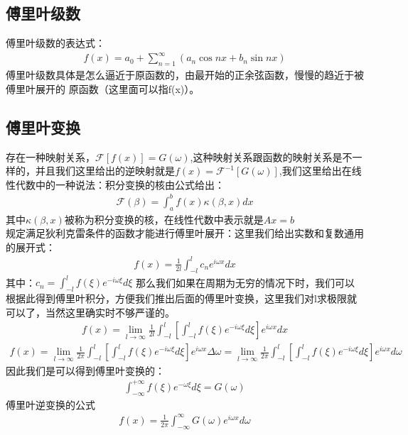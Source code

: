 \documentclass[UTF8]{article}
\begin{document}
\subsection{傅里叶级数}
傅里叶级数的表达式：
\begin{align*}
	f(x)=a_0+\sum_{n=1}^{\infty}(a_n \cos nx +b_n\sin nx)
\end{align*}
傅里叶级数具体是怎么逼近于原函数的，由最开始的正余弦函数，慢慢的趋近于被傅里叶展开的
原函数（这里面可以指f(x)）。
\subsection{傅里叶变换}
存在一种映射关系，$\mathcal{F}[f(x)]=G(\omega)$,这种映射关系跟函数的映射关系是不一样的，并且我们这里给出的逆映射就是$f(x)=\mathcal{F}^{-1}[G(\omega)]$,我们这里给出在线性代数中的一种说法：积分变换的核由公式给出：
\begin{align*}
	\mathcal{F}(\beta)=\int_a^b f(x)\kappa(\beta,x)dx
\end{align*}
其中$\kappa(\beta,x)$被称为积分变换的核，在线性代数中表示就是$Ax=b$\\
规定满足狄利克雷条件的函数才能进行傅里叶展开：这里我们给出实数和复数通用的展开式：
\begin{align*}
	f(x)=\frac{1}{2l}\int_{-l}^{l}c_n e^{i\omega x}dx
\end{align*}
其中：$c_n=\int_{-l}^{l}f(\xi) e^{-i\omega \xi}d\xi$
那么我们如果在周期为无穷的情况下时，我们可以根据此得到傅里叶积分，方便我们推出后面的傅里叶变换，这里我们对l求极限就可以了，当然这里确实时不够严谨的。
\begin{align*}
	f(x)=\lim_{l\rightarrow\infty}\frac{1}{2l}\int_{-l}^{l}\left[\int_{-l}^{l}f(\xi)e^{-i\omega \xi }d\xi\right]e^{i\omega x}dx
\end{align*}
\begin{gather*}
	f(x)=\lim_{l\rightarrow\infty}\frac{1}{2\pi}\int_{-l}^{l}\left[\int_{-l}^{l}f(\xi)e^{-i\omega \xi }d\xi \right]e^{i\omega x}\Delta\omega=\lim_{l\rightarrow\infty}\frac{1}{2\pi}\int_{-l}^{l}\left[\int_{-l}^{l}f(\xi)e^{-i\omega \xi }d\xi \right]e^{i\omega x}d\omega
\end{gather*}
因此我们是可以得到傅里叶变换的：
\begin{align*}
	\int _{-\infty}^{+\infty}f(\xi)e^{-\omega \xi }d\xi=G(\omega)
\end{align*}
傅里叶逆变换的公式
\begin{align*}
	f(x)=\frac{1}{2\pi}\int_{-\infty}^{\infty}G(\omega)e^{i\omega x}d\omega
\end{align*}
\end{document}
